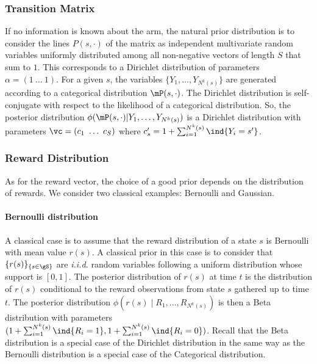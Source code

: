 \begin{subappendices}
\subsubsection{Transition Matrix}
If no information is known about the arm, the natural prior distribution is to consider the lines $P(s,\cdot)$ of the matrix as independent multivariate random variables uniformly distributed among all non-negative vectors of length $S$ that sum to $1$. 
This corresponds to a Dirichlet distribution of parameters $\alpha=(1\ \dots\ 1)$. 
For a given $s$, the variables $\{Y_1,\dots,Y_{N^{k}(s)}\}$ are generated according to a categorical distribution $\mP(s,\cdot)$. 
The Dirichlet distribution is self-conjugate with respect to the likelihood of a categorical distribution. 
So, the posterior distribution $\phi(\mP(s,\cdot)| Y_1,\dots,Y_{N^{k}(s)})$ is a Dirichlet distribution with parameters $\vc=(c_1\ \dots\ c_S)$ where $c_s'=1+\sum_{i=1}^{N^{k}(s)}\ind{Y_i=s'}$.

\subsubsection{Reward Distribution}
\label{apx:reward_post}

As for the reward vector, the choice of a good prior depends on the distribution of rewards. 
We consider two classical examples: Bernoulli and Gaussian.

\paragraph{Bernoulli distribution}
A classical case is to assume that the reward distribution of a state $s$ is Bernoulli with mean value $r(s)$.
A classical prior in this case is to consider that $\{r(s)\}_{\{s\in\gS\}}$ are \emph{i.i.d.} random variables following a uniform distribution whose support is $[0,1]$. 
The posterior distribution of $r(s)$ at time $t$ is the distribution of $r(s)$ conditional to the reward observations from state $s$ gathered up to time $t$. 
The posterior distribution $\phi(r(s)\mid R_1,\dots,R_{N^{k}(s)})$ is then a Beta distribution with parameters $(1+\sum_{i=1}^{N^{k}(s)}\ind{R_i=1}, 1+\sum_{i=1}^{N^{k}(s)}\ind{R_i=0})$. 
Recall that the Beta distribution is a special case of the Dirichlet distribution in the same way as the Bernoulli distribution is a special case of the Categorical distribution. 


\end{subappendices}

